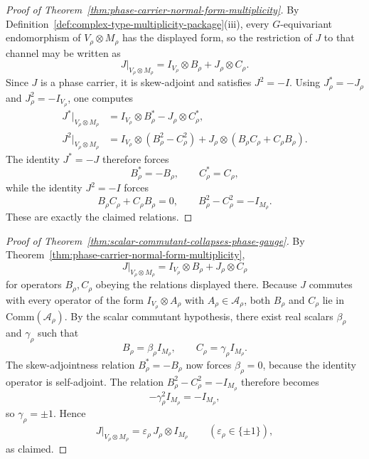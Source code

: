 \begin{proof}[Proof of Theorem~\ref{thm:phase-carrier-normal-form-multiplicity}]
\label{proof:thm:phase-carrier-normal-form-multiplicity}
By Definition~\ref{def:complex-type-multiplicity-package}(iii), every
$G$-equivariant endomorphism of $V_{\rho}\otimes M_{\rho}$ has the displayed
form, so the restriction of $J$ to that channel may be written as
\[
J|_{V_{\rho}\otimes M_{\rho}}
=
I_{V_{\rho}}\otimes B_{\rho}
+ J_{\rho}\otimes C_{\rho}.
\]
Since $J$ is a phase carrier, it is skew-adjoint and satisfies $J^2=-I$.
Using $J_{\rho}^*=-J_{\rho}$ and $J_{\rho}^2=-I_{V_{\rho}}$, one computes
\begin{align*}
J^*|_{V_{\rho}\otimes M_{\rho}}
&=
I_{V_{\rho}}\otimes B_{\rho}^*
- J_{\rho}\otimes C_{\rho}^*, \\
J^2|_{V_{\rho}\otimes M_{\rho}}
&=
I_{V_{\rho}}\otimes (B_{\rho}^2-C_{\rho}^2)
+ J_{\rho}\otimes (B_{\rho}C_{\rho}+C_{\rho}B_{\rho}).
\end{align*}
The identity $J^*=-J$ therefore forces
\[
B_{\rho}^*=-B_{\rho},
\qquad
C_{\rho}^*=C_{\rho},
\]
while the identity $J^2=-I$ forces
\[
B_{\rho}C_{\rho}+C_{\rho}B_{\rho}=0,
\qquad
B_{\rho}^2-C_{\rho}^2=-I_{M_{\rho}}.
\]
These are exactly the claimed relations.
\end{proof}

\begin{proof}[Proof of Theorem~\ref{thm:scalar-commutant-collapses-phase-gauge}]
\label{proof:thm:scalar-commutant-collapses-phase-gauge}
By Theorem~\ref{thm:phase-carrier-normal-form-multiplicity},
\[
J|_{V_{\rho}\otimes M_{\rho}}
=
I_{V_{\rho}}\otimes B_{\rho}
+ J_{\rho}\otimes C_{\rho}
\]
for operators $B_{\rho},C_{\rho}$ obeying the relations displayed there.
Because $J$ commutes with every operator of the form
$I_{V_{\rho}}\otimes A_{\rho}$ with $A_{\rho}\in\mathcal A_{\rho}$, both
$B_{\rho}$ and $C_{\rho}$ lie in $\mathrm{Comm}(\mathcal A_{\rho})$. By the
scalar commutant hypothesis, there exist real scalars $\beta_{\rho}$ and
$\gamma_{\rho}$ such that
\[
B_{\rho}=\beta_{\rho}I_{M_{\rho}},
\qquad
C_{\rho}=\gamma_{\rho}I_{M_{\rho}}.
\]
The skew-adjointness relation $B_{\rho}^*=-B_{\rho}$ now forces
$\beta_{\rho}=0$, because the identity operator is self-adjoint. The relation
$B_{\rho}^2-C_{\rho}^2=-I_{M_{\rho}}$ therefore becomes
\[
-\gamma_{\rho}^2I_{M_{\rho}}=-I_{M_{\rho}},
\]
so $\gamma_{\rho}=\pm1$. Hence
\[
J|_{V_{\rho}\otimes M_{\rho}}
=
\varepsilon_{\rho}\,J_{\rho}\otimes I_{M_{\rho}}
\qquad(\varepsilon_{\rho}\in\{\pm1\}),
\]
as claimed.
\end{proof}

